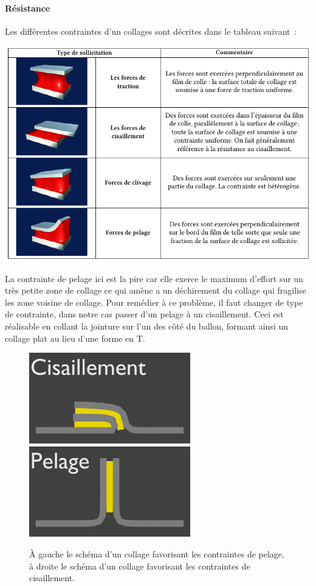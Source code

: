 \documentclass[a4paper,11pt]{article}
\begin{document}
\paragraph{Résistance}

Les différentes contraintes d'un collages sont décrites dans le tableau suivant~:
\begin{center}
 \includegraphics[width=15cm]{../Images/colle_contraintes.png}
\end{center}

La contrainte de pelage ici est la pire car elle exerce le maximum d'effort sur un très petite zone de collage ce qui amène a un déchirement du collage qui fragilise les zone voisine de collage. Pour remédier à ce problème, il faut changer de type de contrainte, dans notre cas passer d'un pelage à un cisaillement. Ceci est réalisable en collant la jointure sur l'un des côté du ballon, formant ainsi un collage plat au lieu d'une forme en T.

\begin{figure}[H]
	\centering
 \includegraphics[width=7cm]{../Images/colle_cisaillement.png}
 \includegraphics[width=7cm]{../Images/colle_pelage.png}
 \caption{À gauche le schéma d'un collage favorisant les contraintes de pelage, à droite le schéma d'un collage favorisant les contraintes de cisaillement.}
\end{figure}
\end{document}
